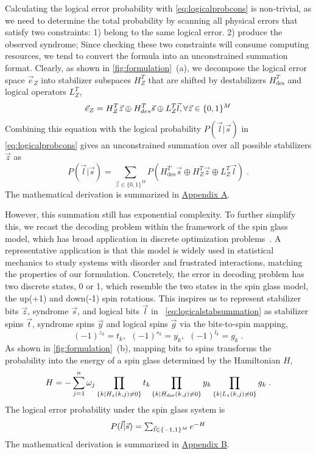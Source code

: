 Calculating the logical error probability with \eqref{eq:logicalprobcons} is non-trivial, as we need to determine the total probability by scanning all physical errors that satisfy two constraints: 1) belong to the same logical error.  2) produce the observed syndrome;
Since checking these two constraints will consume computing resources, we tend to convert the formula into an unconstrained summation format. Clearly, as shown in \autoref{fig:formulation}~(a), we decompose the logical error space $\vec{e}_Z$ into stabilizer subspaces $H_Z^T$ that are shifted by destabilizers $H_{\text{des}}^T$ and logical operators $L_Z^T$,
\begin{equation}\small
    \vec{e}_Z= H_Z^T \vec{z} \oplus H_{des}^T\vec{s}\oplus L_Z^T\vec{l},\forall \vec{z}\in\{0,1\}^M
\end{equation}
Combining this equation with the logical probability $P(\vec{l}|\vec{s})$ in \eqref{eq:logicalprobcons} gives an unconstrained summation over all possible stabilizers $\vec{z}$ as
\begin{equation}\label{eq:logicalstabsummation}
    P(\vec{l}|\vec{s}) =  \textstyle  \sum_{\vec{z} \in \{0,1\}^M} P(H_{\text{des}}^T \vec{s} \oplus H_Z^T \vec{z} \oplus L_Z^T \vec{l})\;.
\end{equation}
The mathematical derivation is summarized in \hyperref[subsec:proofA]{Appendix A}.

However, this summation still has exponential complexity.
To further simplify this, we recast the decoding problem within the framework of the spin glass model, which has broad application in discrete optimization problems~\cite{wiki_spin_glass}. A representative application is that this model is widely used in statistical mechanics to study systems with disorder and frustrated interactions, matching the properties of our formulation. Concretely, the error in decoding problem has two discrete states, 0 or 1, which resemble the two states in the spin glass model, the up(+1) and down(-1) spin rotations. This inspires us to represent stabilizer bits $\vec{z}$, syndrome $\vec{s}$, and logical bits $\vec{l}$ in ~\eqref{eq:logicalstabsummation} as stabilizer spins $\vec{t}$, syndrome spins $\vec{y}$ and logical spins $\vec{g}$ via the bits-to-spin mapping,
\begin{equation}
    (-1)^{z_k} = t_k, ~~(-1)^{s_k} = y_k, ~~(-1)^{l_k} = g_k\;.
\end{equation}
As shown in \autoref{fig:formulation}~(b), mapping bits to spins transforms the probability into the energy of a spin glass determined by the Hamiltonian $H$,
\begin{equation}\small
    H = -\sum_{j=1}^{n} \omega_j\prod_{\{k|H_z(k,j)\neq0\}} t_k  \prod_{\{k|H_{\text{des}}(k,j)\neq0\}} y_k  \prod_{\{k|L_z(k,j)\neq0\}} g_k \;.
\end{equation}
 The logical error probability under the spin glass system is
\begin{equation}\small\label{eq:logicalprobfreeenergy}
    P(\vec{l}|\vec{s})=  \textstyle \sum_{\vec{t}\in\{-1,1\}^{M}} e^{-H}
\end{equation}
The mathematical derivation is summarized in \hyperref[subsec:proofB]{Appendix B}. 

